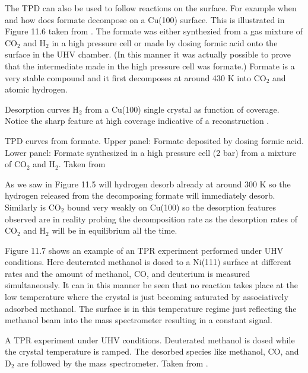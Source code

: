 The TPD can also be used to follow reactions on the surface. For example  when and how does formate decompose on a Cu(100) surface. This is illustrated in Figure 11.6 taken from \cite{HonCu}. The formate was either synthezied from a gas mixture of CO$_2$ and H$_2$ in a high pressure cell or made by dosing formic acid onto the surface in the UHV chamber. (In this manner it was actually possible to prove that the intermediate made in the high pressure cell was formate.) Formate is a very stable compound and it first decomposes at around 430 K into CO$_2$  and atomic hydrogen. 


\vspace*{8cm}

 Desorption curves  H$_2$ from a Cu(100) single crystal as function of coverage. Notice the sharp feature at high coverage indicative of a reconstruction \cite{Rasmussen}.


\vspace*{9cm}

  TPD curves from formate. Upper panel:  Formate deposited by dosing formic acid.  Lower panel: Formate synthesized in a high pressure cell (2 bar) from a mixture of CO$_2$ and H$_2$. Taken from \cite{HonCu}





 As we saw in Figure 11.5 will hydrogen desorb already at around 300 K so the hydrogen released from the decomposing formate will immediately desorb. Similarly is CO$_2$ bound very weakly on Cu(100) so the desorption features observed are in reality probing the decomposition rate as the desorption rates of CO$_2$ and H$_2$  will be in equilibrium all the time.

Figure 11.7 shows an example of an TPR experiment performed under UHV conditions. Here deuterated methanol is dosed to a Ni(111) surface at different rates and the amount of methanol, CO, and deuterium is measured simultaneously. It can in this manner be seen that no reaction takes place  at the low temperature where the crystal is just becoming saturated by associatively adsorbed methanol. The surface is in this temperature regime just  reflecting the methanol beam  into the mass spectrometer resulting in a constant signal. 


\vspace*{11cm}

 A TPR experiment under UHV conditions. Deuterated methanol is dosed while the crystal temperature is ramped. The desorbed species like methanol, CO, and D$_{2}$ are followed by the mass spectrometer. Taken from \cite{Yates2}.

